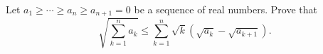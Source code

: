 Let $a_1 \geq \cdots \geq a_n \geq a_{n+1} = 0$ be a sequence of real numbers. Prove that \[ \sqrt{\sum_{k=1}^{n} a_k} \leq \sum_{k=1}^{n} \sqrt{k}(\sqrt{a_k} - \sqrt{a_{k+1}}). \]
